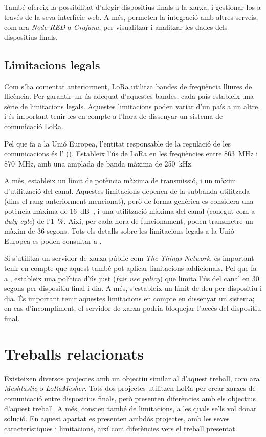 \documentclass{tfgitic}[2024/07/01]
\begin{document}
També ofereix la possibilitat d'afegir dispositius finals a la xarxa, i gestionar-los a través de la seva interfície web. A més, permeten la integració amb altres serveis, com ara \emph{Node-RED} o \emph{Grafana}, per visualitzar i analitzar les dades dels dispositius finals.

\subsection{Limitacions legals}
\label{subsec:limitacions_legals}
Com s'ha comentat anteriorment, LoRa utilitza bandes de freqüència lliures de llicència. Per garantir un ús adequat d'aquestes bandes, cada país estableix una sèrie de limitacions legals. Aquestes limitacions poden variar d'un país a un altre, i és important tenir-les en compte a l'hora de dissenyar un sistema de comunicació LoRa. 

Pel que fa a la Unió Europea, l'entitat responsable de la regulació de les comunicacions és l' (). Estableix l'ús de LoRa en les freqüències entre \SI{863}{\MHz} i \SI{870}{\MHz}, amb una amplada de banda màxima de \SI{250}{\kHz}.

A més, estableix un límit de potència màxima de transmissió, i un màxim d'utilització del canal. Aquestes limitacions depenen de la subbanda utilitzada (dins el rang anteriorment mencionat), però de forma genèrica es considera una potència màxima de \SI{16}{\deci\bel{}}, i una utilització màxima del canal (conegut com a \emph{duty cyle}) de l'\SI{1}{\%}. Així, per cada hora de funcionament, poden transmetre un màxim de 36 segons. Tots els detalls sobre les limitacions legals a la Unió Europea es poden consultar a \cite{etsi_etsi_nodate}.

Si s'utilitza un servidor de xarxa públic com \emph{The Things Network}, és important tenir en compte que aquest també pot aplicar limitacions addicionals. Pel que fa a , estableix una política d'ús just (\emph{fair use policy}) que limita l'ús del canal en 30 segons per dispositiu final i dia. A més, s'estableix un límit de deu  per dispositiu i dia. És important tenir aquestes limitacions en compte en dissenyar un sistema; en cas d'incompliment, el servidor de xarxa podria bloquejar l'accés del dispositiu final.

\section{Treballs relacionats}
\label{sec:treballs_relacionats}
Existeixen diversos projectes amb un objectiu similar al d'aquest treball, com ara \emph{Meshtastic} o \emph{LoRaMesher}. Tots dos projectes utilitzen LoRa per crear xarxes de comunicació entre dispositius finals, però presenten diferències amb els objectius d'aquest treball. A més, consten també de limitacions, a les quals se'ls vol donar solució. En aquest apartat es presenten ambdós projectes, amb les seves característiques i limitacions, així com diferències vers el treball presentat.
\end{document}
